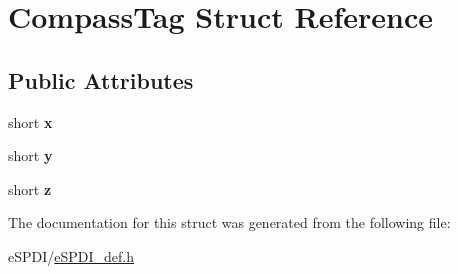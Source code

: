 \hypertarget{struct_compass_tag}{}\section{Compass\+Tag Struct Reference}
\label{struct_compass_tag}
\subsection*{Public Attributes}
\begin{DoxyCompactItemize}
\item 
\mbox{\label{struct_compass_tag_a70cc7e18023578f725dd44cec09f5d3a}} 
short {\bfseries x}
\item 
\mbox{\label{struct_compass_tag_ac86c437c174dc743e10481476d1fd555}} 
short {\bfseries y}
\item 
\mbox{\label{struct_compass_tag_a26dd4728ef9697016fbe55163d88afa3}} 
short {\bfseries z}
\end{DoxyCompactItemize}


The documentation for this struct was generated from the following file\+:\begin{DoxyCompactItemize}
\item 
e\+S\+P\+D\+I/\hyperlink{e_s_p_d_i__def_8h}{e\+S\+P\+D\+I\+\_\+def.\+h}\end{DoxyCompactItemize}
